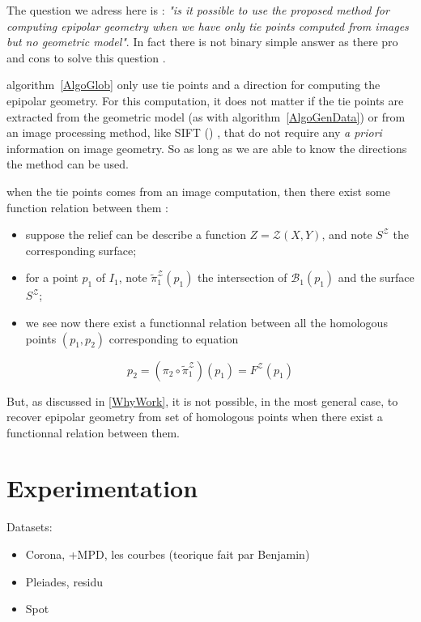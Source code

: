 \documentclass{ipol}
\newcommand{\Bund}[1]{\ensuremath{\mathcal{B}_{#1}}}
\newcommand{\BundO}{\Bund{1}}
\newcommand{\PiZVert}{\widetilde{\pi}_1^{\mathcal{Z}} }
\begin{document}
The question we adress here is : \emph{"is it possible to use
the proposed method  for computing epipolar geometry
when we have only  tie points computed from images but no geometric model"}.  In fact
there is not binary simple answer as there pro and cons to solve this question .

  algorithm~\ref{AlgoGlob} only use tie points and a
direction for computing the epipolar geometry. For this computation,
it does not matter if the tie points are extracted from the geometric model
(as with algorithm~\ref{AlgoGenData}) or from an image 
processing method, like SIFT (\cite{LOWE}) , that do not require any
\emph{a priori} information on image geometry. So as long as we
are able to know the directions the method can be used.


 when the tie points comes from an image computation,
then there exist some function relation between them :

\begin{itemize}
   \item suppose the relief can be describe a function $Z=\mathcal{Z}(X,Y)$,
         and note $S^\mathcal{Z}$  the corresponding surface;
   \item for a point $p_1$ of $I_1$, note $ \PiZVert (p_1)$
         the intersection of  $\BundO(p_1)$ and the surface  $S^\mathcal{Z}$;
   \item we see now there exist a functionnal relation between all the homologous
         points $(p_1,p_2)$ corresponding to equation 
\end{itemize}

\begin{equation}
   p_2 = (\pi_2 \circ  \PiZVert) (p_1) = F^\mathcal{Z}(p_1)
\end{equation}


But, as discussed in \ref{WhyWork}, it is not possible, in the most general
case, to recover epipolar geometry from set of homologous points when there exist
a functionnal relation between them.



\section{Experimentation}

Datasets:
\begin{itemize}
\item Corona, +MPD, les courbes (teorique fait par Benjamin)
\item Pleiades, residu 
\item Spot
\end{itemize}
\end{document}
